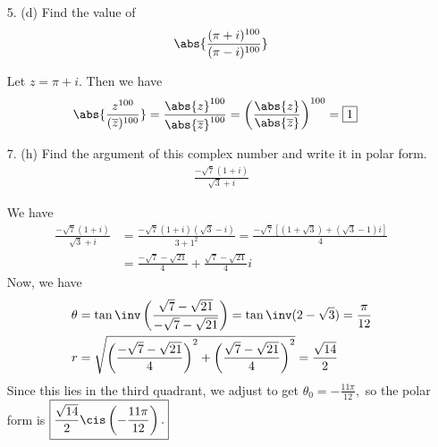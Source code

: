 \documentclass{article}
\begin{document}
\begin{itemize}
	\item[5.] (d) Find the value of
		\begin{align*}
			\abs{\frac{(\pi+i)^{100}}{(\pi-i)^{100}}}
		\end{align*}
		\begin{soln}
			Let $z=\pi+i.$ Then we have
			\begin{align*}
				\abs{\frac{z^{100}}{(\overline z)^{100}}} &= \frac{\abs{z}^{100}}{\abs{\overline z}^{100}} = \left( \frac{\abs{z}}{\abs{\overline z}} \right)^{100} = \boxed{1}
			\end{align*}
		\end{soln}

	\item[7.] (h) Find the argument of this complex number and write it in polar form. 
		\begin{align*}
			\frac{-\sqrt{7}(1+i)}{\sqrt{3}+i}
		\end{align*}
		\begin{soln}
			We have
			\begin{align*}
				\frac{-\sqrt{7}(1+i)}{\sqrt{3}+i} &= \frac{-\sqrt{7}(1+i)(\sqrt{3}-i)}{3+1^2} = \frac{-\sqrt{7}\left[ (1+\sqrt{3})+(\sqrt{3}-1)i \right]}{4} \\
				&= \frac{-\sqrt{7}-\sqrt{21}}{4} + \frac{\sqrt{7}-\sqrt{21}}{4}i
			\end{align*}
			Now, we have
			\begin{align*}
				\theta &= \tan\inv\left( \frac{\sqrt{7}-\sqrt{21}}{-\sqrt{7}-\sqrt{21}} \right) = \tan\inv(2-\sqrt{3}) = \frac{\pi}{12} \\
				r &= \sqrt{\left( \frac{-\sqrt{7}-\sqrt{21}}{4} \right)^2 + \left( \frac{\sqrt{7}-\sqrt{21}}{4} \right)^2} = \frac{\sqrt{14}}{2}
			\end{align*}
			Since this lies in the third quadrant, we adjust to get $\theta_0=-\frac{11\pi}{12},$ so the polar form is $\boxed{\frac{\sqrt{14}}{2}\cis\left( -\frac{11\pi}{12} \right).}$
		\end{soln}


\end{itemize}
\end{document}
